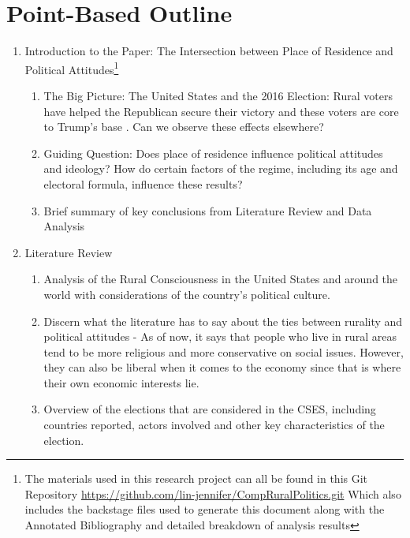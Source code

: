 \documentclass[12pt]{article}
\title{\tb{Place of Residence and Political Attitudes in Democracies Worldwide \\ {\large Point-Based Outline} }}
\author{Jennifer Lin}
\affil{Transitions to Democracy}
\begin{document}
\maketitle 

\section{Point-Based Outline}

\begin{enumerate}
\item Introduction to the Paper: The Intersection between Place of Residence and Political Attitudes\footnote{The materials used in this research project can all be found in this Git Repository \url{https://github.com/lin-jennifer/CompRuralPolitics.git} Which also includes the backstage files used to generate this document along with the Annotated Bibliography and detailed breakdown of analysis results}
\begin{enumerate}
	\item The Big Picture: The United States and the 2016 Election: Rural voters have helped the Republican secure their victory and these voters are core to Trump's base \citep{walsh_putting_2012}. Can we observe these effects elsewhere?
	\item Guiding Question: Does place of residence influence political attitudes and ideology? How do certain factors of the regime, including its age and electoral formula, influence these results?
	\item Brief summary of key conclusions from Literature Review and Data Analysis
\end{enumerate}
\item Literature Review
\begin{enumerate}
	\item Analysis of the Rural Consciousness in the United States and around the world with considerations of the country's political culture.
	\item Discern what the literature has to say about the ties between rurality and political attitudes - As of now, it says that people who live in rural areas tend to be more religious and more conservative on social issues. However, they can also be liberal when it comes to the economy since that is where their own economic interests lie.
	\item Overview of the elections that are considered in the CSES, including countries reported, actors involved and other key characteristics of the election. 
\end{enumerate}

\end{enumerate}
\end{document}
